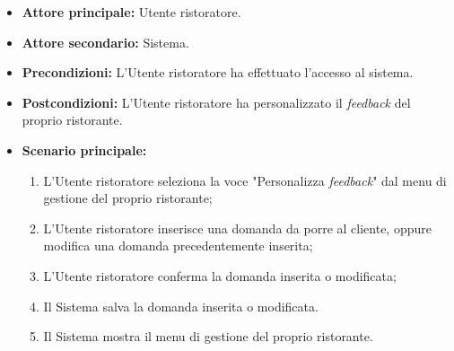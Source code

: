 \label{usecase:Personalizzazione del feedback da parte del business}
\begin{itemize}
	\item \textbf{Attore principale:} Utente ristoratore.

	\item \textbf{Attore secondario:} Sistema.

	\item \textbf{Precondizioni:}
	      L'Utente ristoratore ha effettuato l'accesso al sistema.

	\item \textbf{Postcondizioni:}
	      L'Utente ristoratore ha personalizzato il \textit{feedback} del proprio
	      ristorante.

	\item \textbf{Scenario principale:}
	      \begin{enumerate}
		      \item L'Utente ristoratore seleziona la voce "Personalizza
			  \textit{feedback}" dal menu di gestione del proprio ristorante;

		      \item L'Utente ristoratore inserisce una domanda da porre al
		            cliente, oppure modifica una domanda precedentemente
		            inserita;

		      \item L'Utente ristoratore conferma la domanda inserita o
		            modificata;

		      \item Il Sistema salva la domanda inserita o modificata.

		      \item Il Sistema mostra il menu di gestione del proprio
		            ristorante.
	      \end{enumerate}
\end{itemize}
